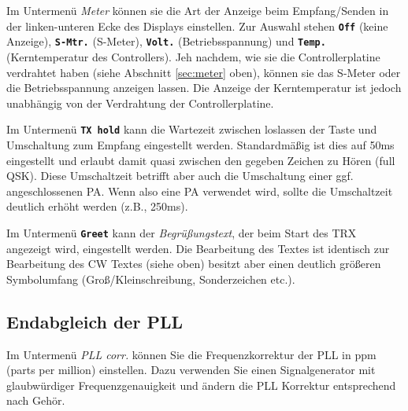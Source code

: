 \documentclass[10pt, a4paper]{paper}
\newcommand{\dis}[1]{\textbf{\texttt{#1}}}
\begin{document}
Im Untermenü \emph{Meter} können sie die Art der Anzeige beim Empfang/Senden in der linken-unteren Ecke des Displays einstellen. Zur Auswahl stehen \dis{Off} (keine Anzeige), \dis{S-Mtr.} (S-Meter), \dis{Volt.} (Betriebsspannung) und \dis{Temp.} (Kerntemperatur des Controllers). Jeh nachdem, wie sie die Controllerplatine verdrahtet haben (siehe Abschnitt \ref{sec:meter} oben), können sie das S-Meter oder die Betriebsspannung anzeigen lassen. Die Anzeige der Kerntemperatur ist jedoch unabhängig von der Verdrahtung der Controllerplatine.	

Im Untermenü \dis{TX hold} kann die Wartezeit zwischen loslassen der Taste und Umschaltung zum Empfang eingestellt werden. Standardmäßig ist dies auf 50ms eingestellt und erlaubt damit quasi zwischen den gegeben Zeichen zu Hören (full QSK). Diese Umschaltzeit betrifft aber auch die Umschaltung einer ggf. angeschlossenen PA. Wenn also eine PA verwendet wird, sollte die Umschaltzeit deutlich erhöht werden (z.B., 250ms).
		
Im Untermenü \dis{Greet} kann der \emph{Begrüßungstext}, der beim Start des TRX angezeigt wird, eingestellt werden. Die Bearbeitung des Textes ist identisch zur Bearbeitung des CW Textes (siehe oben) besitzt aber einen deutlich größeren Symbolumfang (Groß/Kleinschreibung, Sonderzeichen etc.). 

\subsection{Endabgleich der PLL}
Im Untermenü \emph{PLL corr.} können Sie die Frequenzkorrektur der PLL in ppm (parts per million) einstellen. Dazu  verwenden Sie einen Signalgenerator mit glaubwürdiger Frequenzgenauigkeit und ändern die PLL Korrektur entsprechend nach Gehör.


\clearpage
\end{document}
